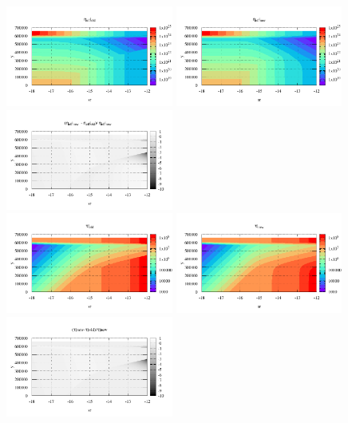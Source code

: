 \begin{itemize}
\newpage
\begin{center}
\includegraphics[width=5.5cm]{images/rheology/example/map_etaeff_old_pl-1}
\includegraphics[width=5.5cm]{images/rheology/example/map_etaeff_new_pl-1}
\includegraphics[width=5.5cm]{images/rheology/example/map_etaeff_diff_pl-1}\\
\includegraphics[width=5.5cm]{images/rheology/example/map_tau_old_pl-1}
\includegraphics[width=5.5cm]{images/rheology/example/map_tau_new_pl-1}
\includegraphics[width=5.5cm]{images/rheology/example/map_tau_diff_pl-1}\\

\end{center}
\end{itemize}
